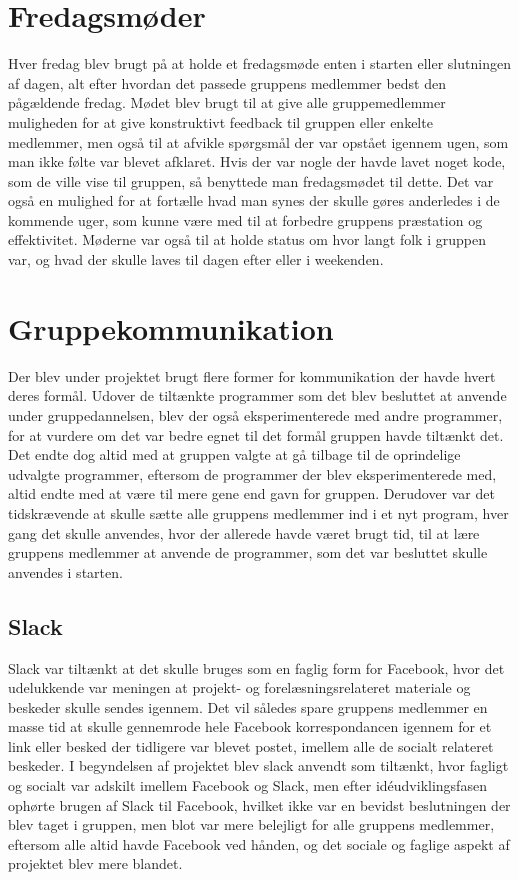 \section{Fredagsmøder}\label{Fredagsmoeder}
Hver fredag blev brugt på at holde et fredagsmøde enten i starten eller slutningen af dagen, alt efter hvordan det passede gruppens medlemmer bedst den pågældende fredag. Mødet blev brugt til at give alle gruppemedlemmer muligheden for at give konstruktivt feedback til gruppen eller enkelte medlemmer, men også til at afvikle spørgsmål der var opstået igennem ugen, som man ikke følte var blevet afklaret. Hvis der var nogle der havde lavet noget kode, som de ville vise til gruppen, så benyttede man fredagsmødet til dette. Det var også en mulighed for at fortælle hvad man synes der skulle gøres anderledes i de kommende uger, som kunne være med til at forbedre gruppens præstation og effektivitet. Møderne var også til at holde status om hvor langt folk i gruppen var, og hvad der skulle laves til dagen efter eller i weekenden.

\section{Gruppekommunikation}\label{Gruppekommunikation}
Der blev under projektet brugt flere former for kommunikation der havde hvert deres formål. Udover de tiltænkte programmer som det blev besluttet at anvende under gruppedannelsen, blev der også eksperimenterede med andre programmer, for at vurdere om det var bedre egnet til det formål gruppen havde tiltænkt det. Det endte dog altid med at gruppen valgte at gå tilbage til de oprindelige udvalgte programmer, eftersom de programmer der blev eksperimenterede med, altid endte med at være til mere gene end gavn for gruppen. Derudover var det tidskrævende at skulle sætte alle gruppens medlemmer ind i et nyt program, hver gang det skulle anvendes, hvor der allerede havde været brugt tid, til at lære gruppens medlemmer at anvende de programmer, som det var besluttet skulle anvendes i starten.

\subsection{Slack}\label{Slack}
Slack var tiltænkt at det skulle bruges som en faglig form for Facebook, hvor det udelukkende var meningen at projekt- og forelæsningsrelateret materiale og beskeder skulle sendes igennem. Det vil således spare gruppens medlemmer en masse tid at skulle gennemrode hele Facebook korrespondancen igennem for et link eller besked der tidligere var blevet postet, imellem alle de socialt relateret beskeder. I begyndelsen af projektet blev slack anvendt som tiltænkt, hvor fagligt og socialt var adskilt imellem Facebook og Slack, men efter idéudviklingsfasen ophørte brugen af Slack til Facebook, hvilket ikke var en bevidst beslutningen der blev taget i gruppen, men blot var mere belejligt for alle gruppens medlemmer, eftersom alle altid havde Facebook ved hånden, og det sociale og faglige aspekt af projektet blev mere blandet. 

